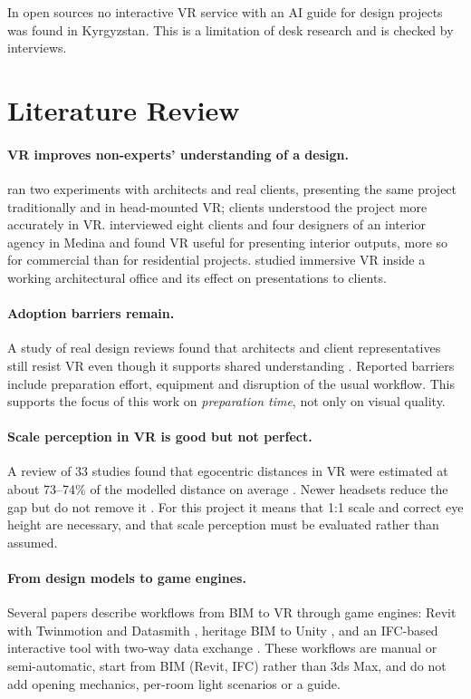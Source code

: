 In open sources no interactive VR service with an AI guide for design projects was found in Kyrgyzstan. This is a limitation of desk research and is checked by interviews.

\section{Literature Review}

\paragraph{VR improves non-experts' understanding of a design.} \citet{serpa2020} ran two experiments with architects and real clients, presenting the same project traditionally and in head-mounted VR; clients understood the project more accurately in VR. \citet{alawwad2024} interviewed eight clients and four designers of an interior agency in Medina and found VR useful for presenting interior outputs, more so for commercial than for residential projects. \citet{kurpinar2025} studied immersive VR inside a working architectural office and its effect on presentations to clients.

\paragraph{Adoption barriers remain.} A study of real design reviews found that architects and client representatives still resist VR even though it supports shared understanding \citep{chalmersvr}. Reported barriers include preparation effort, equipment and disruption of the usual workflow. This supports the focus of this work on \emph{preparation time}, not only on visual quality.

\paragraph{Scale perception in VR is good but not perfect.} A review of 33 studies found that egocentric distances in VR were estimated at about 73--74\% of the modelled distance on average \citep{renner2013}. Newer headsets reduce the gap but do not remove it \citep{kelly2022,creemregehr2023}. For this project it means that 1:1 scale and correct eye height are necessary, and that scale perception must be evaluated rather than assumed.

\paragraph{From design models to game engines.} Several papers describe workflows from BIM to VR through game engines: Revit with Twinmotion and Datasmith \citep{wijerathna2024}, heritage BIM to Unity \citep{pybus2019}, and an IFC-based interactive tool with two-way data exchange \citep{nandavar2018}. These workflows are manual or semi-automatic, start from BIM (Revit, IFC) rather than 3ds Max, and do not add opening mechanics, per-room light scenarios or a guide.

